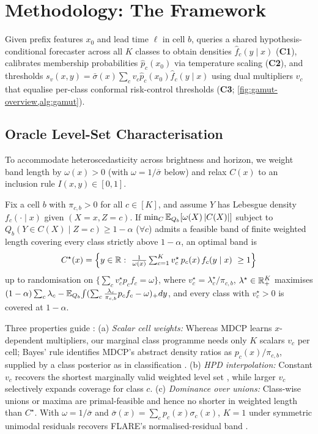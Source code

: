 \section{Methodology: The \gamut{} Framework}
\label{sec:method}

Given prefix features $x_0$ and lead time $\ell$ in cell $b$, \gamut{} queries a shared hypothesis-conditional forecaster across all $K$ classes to obtain densities $\hat f_c(y\mid x)$ (\textbf{C1}), calibrates membership probabilities $\hat p_c(x_0)$ via temperature scaling (\textbf{C2}), and thresholds $s_v(x,y)=\bar\sigma(x)\sum_c v_c\hat p_c(x_0)\hat f_c(y\mid x)$ using dual multipliers $v_c$ that equalise per-class conformal risk-control thresholds (\textbf{C3}; \cref{fig:gamut-overview,alg:gamut}).

\subsection{Oracle Level-Set Characterisation}
\label{sec:oracle}
To accommodate heteroscedasticity across brightness and horizon, we weight band length by $\omega(x)>0$ (with $\omega=1/\bar\sigma$ below) and relax $C(x)$ to an inclusion rule $I(x,y)\in[0,1]$.

\begin{proposition}
\label{prop:oracle}
Fix a cell $b$ with $\pi_{c,b}>0$ for all $c\in[K]$, and assume $Y$ has Lebesgue density $f_c(\cdot\mid x)$ given $(X=x,Z=c)$.
If $\min_C \mathbb{E}_{Q_b}[\omega(X)\,|C(X)|]$ subject to $Q_b(Y\in C(X)\mid Z=c)\ge1-\alpha$ ($\forall c$) admits a feasible band of finite weighted length covering every class strictly above $1-\alpha$, an optimal band is
\begin{equation}
\label{eq:oracle}
C^\star(x)=\Big\{y\in\mathbb{R}:\ \tfrac{1}{\omega(x)}\textstyle\sum_{c=1}^K v^\star_{c}\,p_c(x)\,f_c(y\mid x)\ \ge 1\Big\}
\end{equation}
up to randomisation on $\{\sum_c v^\star_c p_c f_c=\omega\}$, where $v^\star_c=\lambda^\star_c/\pi_{c,b}$, $\lambda^\star\in\mathbb{R}_+^K$ maximises $(1-\alpha)\sum_c\lambda_c-\mathbb{E}_{Q_b}\!\int(\sum_c\tfrac{\lambda_c}{\pi_{c,b}}p_c f_c-\omega)_+dy$, and every class with $v^\star_c>0$ is covered at $1-\alpha$.
\end{proposition}

Three properties guide \gamut{}:
(a) \emph{Scalar cell weights:} Whereas MDCP learns $x$-dependent multipliers, our marginal class programme needs only $K$ scalars $v_c$ per cell; Bayes' rule identifies MDCP's abstract density ratios \citep[Thm.~7]{yang2026multi} as $p_c(x)/\pi_{c,b}$, supplied by a class posterior as in classification \citep{sadinle2019least}.
(b) \emph{HPD interpolation:} Constant $v_c$ recovers the shortest marginally valid weighted level set \citep{lei2013distribution,lei2014distribution}, while larger $v_c$ selectively expands coverage for class $c$.
(c) \emph{Dominance over unions:} Class-wise unions or maxima are primal-feasible and hence no shorter in weighted length than $C^\star$.
With $\omega=1/\bar\sigma$ and $\bar\sigma(x)=\sum_c p_c(x)\sigma_c(x)$, $K=1$ under symmetric unimodal residuals recovers FLARE's normalised-residual band \citep{lei2018distribution}.

